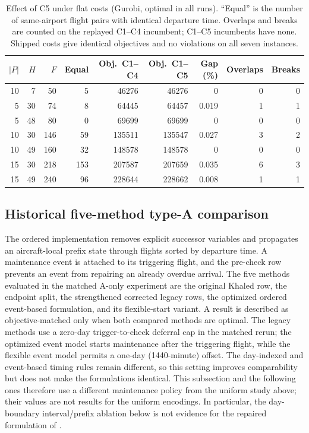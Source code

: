 \begin{table}[t]
\centering\small
\caption{Effect of C5 under flat costs (Gurobi, optimal in all runs). ``Equal''
is the number of same-airport flight pairs with identical departure time.
Overlaps and breaks are counted on the replayed C1--C4 incumbent; C1--C5
incumbents have none. Shipped costs give identical objectives and no
violations on all seven instances.}
\label{tab:c5_impact}
\begin{tabular}{rrrr rrr rr}
\toprule
$|P|$ & $H$ & $F$ & Equal & Obj.\ C1--C4 & Obj.\ C1--C5 & Gap (\%) & Overlaps & Breaks \\
\midrule
10 & 7  & 50  & 5   & 46276  & 46276  & 0     & 0 & 0 \\
5  & 30 & 74  & 8   & 64445  & 64457  & 0.019 & 1 & 1 \\
5  & 48 & 80  & 0   & 69699  & 69699  & 0     & 0 & 0 \\
10 & 30 & 146 & 59  & 135511 & 135547 & 0.027 & 3 & 2 \\
10 & 49 & 160 & 32  & 148578 & 148578 & 0     & 0 & 0 \\
15 & 30 & 218 & 153 & 207587 & 207659 & 0.035 & 6 & 3 \\
15 & 49 & 240 & 96  & 228644 & 228662 & 0.008 & 1 & 1 \\
\bottomrule
\end{tabular}
\end{table}



\subsection{Historical five-method type-A comparison}
\label{subsec:event_measurements}

The ordered implementation removes explicit successor variables and propagates
an aircraft-local prefix state through flights sorted by departure time. A
maintenance event is attached to its triggering flight, and the pre-check row
prevents an event from repairing an already overdue arrival. The five methods
evaluated in the matched A-only experiment are the original Khaled row,
the endpoint split, the strengthened corrected legacy rows, the optimized
ordered event-based formulation, and its flexible-start variant. A result is
described as objective-matched only when both compared methods are optimal.
The legacy methods use a zero-day trigger-to-check deferral cap in the matched
rerun; the optimized event model starts maintenance after the triggering
flight, while the flexible event model permits a one-day (1440-minute) offset.
The day-indexed and event-based timing rules remain different, so this setting
improves comparability but does not make the formulations identical. This
subsection and the following ones therefore use a different maintenance
policy from the uniform study above; their values are not results for the
uniform encodings. In particular, the day-boundary interval/prefix ablation
below is not evidence for the repaired formulation of
.

